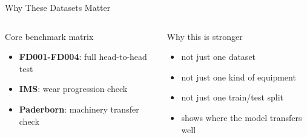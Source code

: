 \begin{frame}{Why These Datasets Matter}
  \begin{columns}[T]
    \begin{block}{Core benchmark matrix}
      \begin{itemize}
        \item \textbf{FD001-FD004}: full head-to-head test
        \item \textbf{IMS}: wear progression check
        \item \textbf{Paderborn}: machinery transfer check
      \end{itemize}
    \end{block}
    \begin{block}{Why this is stronger}
      \begin{itemize}
        \item not just one dataset
        \item not just one kind of equipment
        \item not just one train/test split
        \item shows where the model transfers well
      \end{itemize}
    \end{block}
  \end{columns}
\end{frame}
